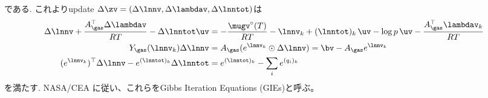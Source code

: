 である. これよりupdate $\Delta \zv = (\Delta \lnnv, \Delta \lambdav, \Delta \lnntot)$は
\begin{align}
\label{eq:update_tce_1_}
    \Delta \lnnv + \frac{A_\gas^\top \Delta \lambdav}{RT} - \Delta \lnntot \uv &= -\frac{\mugv^\circ(T)}{RT} - {\lnnv}_k + (\lnntot)_k \, \uv - \log{p} \, \uv  - \frac{A_\gas^\top \lambdav_k}{RT} \\
\label{eq:update_tce_2_}
    Y_\gas(\lnnv_k) \Delta \lnnv &= A_\gas (e^{\lnnv_k} \odot \Delta \lnnv) = \bv - A_\gas e^{\lnnv_k} \\
\label{eq:update_tce_3_}
    (e^{\lnnv_k})^\top \Delta \lnnv  - e^{(\lnntot)_k} \Delta \lnntot &= e^{(\lnntot)_k} - \sum_i {e^{(q_i)_k}} 
\end{align}
を満たす. NASA/CEA \cite{gordon1994computer}に従い、これらをGibbs Iteration Equations (GIEs)と呼ぶ。

